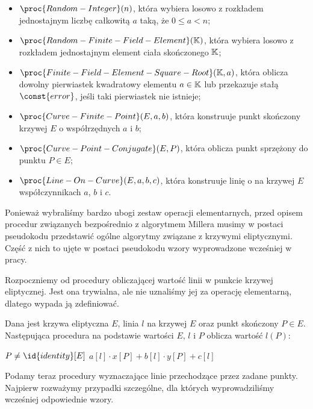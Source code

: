 \begin{remark}
\begin{itemize}
\begin{itemize}
\item $\proc{Random-Integer}(n)$, 
która wybiera losowo z rozkładem jednostajnym
liczbę całkowitą $a$ taką, że $0 \leq a < n$;
\item $\proc{Random-Finite-Field-Element}(\K)$,
która wybiera losowo z rozkładem jednostajnym
element ciała skończonego $\mathbb{K}$;
\item $\proc{Finite-Field-Element-Square-Root}(\K, a)$,
która oblicza
dowolny pierwiastek kwadratowy elementu $a \in \mathbb{K}$
lub przekazuje stałą $\const{error}$, jeśli taki pierwiastek nie istnieje;
\item $\proc{Curve-Finite-Point}(E, a, b)$,
która konstruuje
punkt skończony krzywej $E$ o współrzędnych $a$ i $b$;
\item $\proc{Curve-Point-Conjugate}(E, P)$,
która oblicza
punkt sprzężony do punktu $P \in E$;
\item $\proc{Line-On-Curve}(E, a, b, c)$,
która konstruuje
linię o na krzywej $E$ współczynnikach $a$, $b$ i $c$.
\end{itemize}
\end{itemize}
\end{remark}

Ponieważ wybraliśmy bardzo ubogi zestaw operacji elementarnych,
przed opisem procedur związanych bezpośrednio z algorytmem Millera
musimy w postaci pseudokodu przedstawić
ogólne algorytmy związane z krzywymi eliptycznymi.
Część z nich to ujęte w postaci pseudokodu
wzory wyprowadzone wcześniej w pracy.

Rozpoczniemy od procedury obliczającej
wartość linii w punkcie krzywej eliptycznej.
Jest ona trywialna, ale nie uznaliśmy jej za operację elementarną,
dlatego wypada ją zdefiniować.

\begin{algorithm}
Dana jest krzywa eliptyczna $E$,
linia $l$ na krzywej $E$ oraz punkt skończony $P \in E$.
Następująca procedura
na podstawie wartości $E$, $l$ i $P$
oblicza
wartość $l(P)$:

\begin{codebox}
\li
    \Assert $P \neq \id{identity}[E]$
\li
    \Return $a[l]\cdot x[P] + b[l]\cdot y[P] + c[l]$
\end{codebox}
\end{algorithm}

Podamy teraz procedury wyznaczające linie przechodzące przez zadane punkty.
Najpierw rozważymy przypadki szczególne,
dla których wyprowadziliśmy wcześniej odpowiednie wzory.

